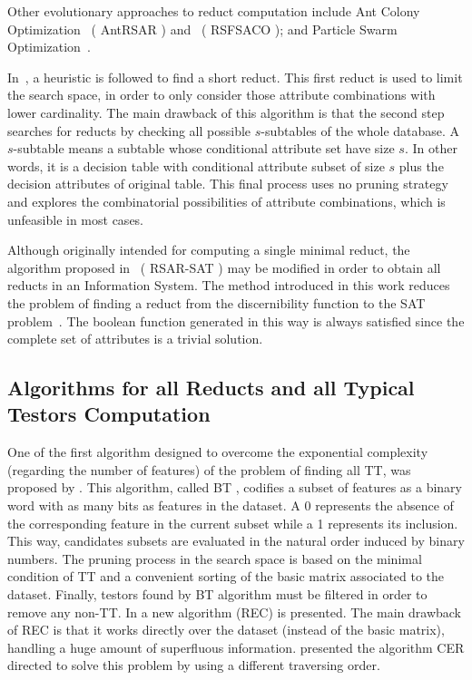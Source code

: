 \documentclass[authoryear,11pt]{elsarticle}
\makeatletter
\newcommand{\setword}[2]{%
  \phantomsection
  #1\def\@currentlabel{\unexpanded{#1}}\label{#2}%
}
\makeatother
\begin{document}
  Other evolutionary approaches to reduct computation include Ant Colony Optimization~\citep{Jensen03} 
  (\setword{AntRSAR}{AntRSAR}) and~\citep{Chen10} (\setword{RSFSACO}{RSFSACO}); and Particle Swarm 
  Optimization~\citep{Wang07}.
    
  In~\citep{Lin04}, a heuristic is followed to find a short reduct. This first reduct is used to limit the search
  space, in order to only consider those attribute combinations with lower cardinality. 
  The main drawback of this algorithm is that the second step searches for reducts by checking all possible 
  $s$-subtables of the whole database. A $s$-subtable means a subtable whose conditional attribute set have 
  size $s$. In other words, it is a decision table with conditional attribute subset of size $s$ plus the decision
  attributes of original table. This final process uses no pruning strategy and explores the combinatorial
  possibilities of attribute combinations, which is unfeasible in most cases.
  
  Although originally intended for computing a single minimal reduct, the algorithm proposed in~\citep{Jensen14}
  (\setword{RSAR-SAT}{RSARSAT}) may be modified in order to obtain all reducts in an Information System. 
  The method introduced in this work
  reduces the problem of finding a reduct from the discernibility function to the SAT problem~\citep{Davis62}. 
  The boolean function generated in this way is always satisfied since the complete set of attributes is a trivial
  solution.
  
    
\subsection{Algorithms for all Reducts and all Typical Testors Computation}
  One of the first algorithm designed to overcome the exponential complexity (regarding
  the number of features) of the problem of finding all TT, was 
  proposed by \cite{Ruiz85}. This algorithm, called \setword{BT}{BT},
  codifies a subset of features as a binary word with as many bits as features in the 
  dataset. A 0 represents the absence of the corresponding feature in the current
  subset while a 1 represents its inclusion. This way, candidates subsets are evaluated
  in the natural order induced by binary numbers. The pruning process in the
  search space is based on the minimal condition of TT and a convenient sorting
  of the basic matrix associated to the dataset. Finally, 
  testors found by BT algorithm must be filtered in order to remove any non-TT.
  In \citep{Shulcloper95b} a new algorithm (REC) is presented.
  The main drawback of REC is that it works directly over the dataset (instead of the
  basic matrix), handling a huge amount of superfluous information. \cite{Ayaquica97}
  presented the algorithm CER directed to solve this problem by using a different traversing
  order. 
	
\end{document}
